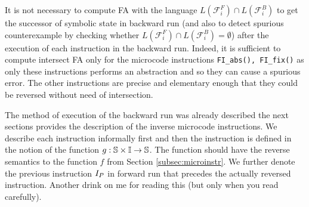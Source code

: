 It is not necessary to compute FA with the language
$L(\mathcal{F}_i^F) \cap L(\mathcal{F}_i^B)$ to get the successor
of symbolic state in backward run (and also to detect spurious counterexample
by checking whether $L(\mathcal{F}_i^F) \cap L(\mathcal{F}_i^B) = \emptyset$)
after the execution of each instruction in the backward run.
Indeed, it is sufficient to compute intersect FA only for
the microcode instructions {\tt FI\_abs(), FI\_fix()}
as only these instructions performs an abstraction
and so they can cause a spurious error.
The other instructions are precise and elementary enough
that they could be reversed without need of intersection.

The method of execution of the backward run was already described
the next sections provides the description of the inverse microcode instructions.
We describe each instruction informally first and then the instruction is defined in the notion
of the function $g: \mathbb{S} \times \mathbb{I} \rightarrow \mathbb{S}$.
The function should have the reverse semantics
to the function $f$ from Section \ref{subsec:microinstr}.
We further denote the previous instruction $I_{P}$ in forward run
that precedes the actually reversed instruction.
Another drink on me for reading this (but only when you read carefully). %

